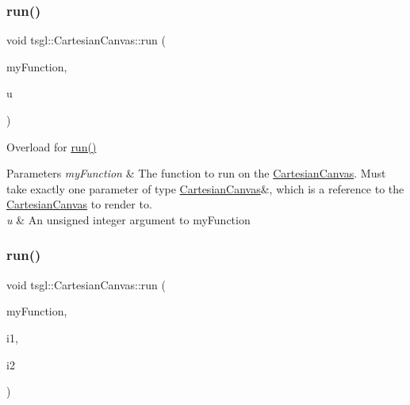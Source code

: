 \subsubsection{\texorpdfstring{run()}{run()}\hspace{0.1cm}{\footnotesize\ttfamily [3/8]}}
{\footnotesize\ttfamily void tsgl\+::\+Cartesian\+Canvas\+::run (\begin{DoxyParamCaption}\item[{void($\ast$)(\hyperlink{classtsgl_1_1_cartesian_canvas}{Cartesian\+Canvas} \&, unsigned)}]{my\+Function,  }\item[{unsigned}]{u }\end{DoxyParamCaption})}



Overload for \hyperlink{classtsgl_1_1_cartesian_canvas_a63a948af53582b713957b872a765dcdb}{run()} 


\begin{DoxyParams}{Parameters}
{\em my\+Function} & The function to run on the \hyperlink{classtsgl_1_1_cartesian_canvas}{Cartesian\+Canvas}. Must take exactly one parameter of type \hyperlink{classtsgl_1_1_cartesian_canvas}{Cartesian\+Canvas}\&, which is a reference to the \hyperlink{classtsgl_1_1_cartesian_canvas}{Cartesian\+Canvas} to render to. \\
\hline
{\em u} & An unsigned integer argument to my\+Function \\
\hline
\end{DoxyParams}
\mbox{\label{classtsgl_1_1_cartesian_canvas_aae4be78e02055eed3e6e85bb39411f21}} 
\subsubsection{\texorpdfstring{run()}{run()}\hspace{0.1cm}{\footnotesize\ttfamily [4/8]}}
{\footnotesize\ttfamily void tsgl\+::\+Cartesian\+Canvas\+::run (\begin{DoxyParamCaption}\item[{void($\ast$)(\hyperlink{classtsgl_1_1_cartesian_canvas}{Cartesian\+Canvas} \&, int, int)}]{my\+Function,  }\item[{int}]{i1,  }\item[{int}]{i2 }\end{DoxyParamCaption})}



